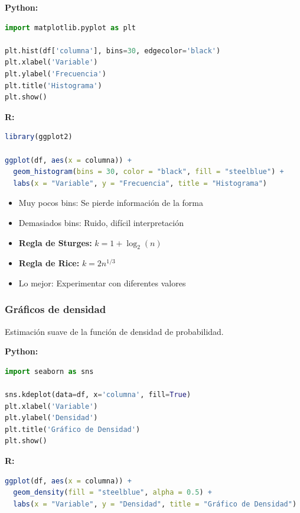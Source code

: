 \documentclass[a4paper,11pt]{article}
\begin{document}
\textbf{Python:}
\begin{lstlisting}[language=Python]
import matplotlib.pyplot as plt

plt.hist(df['columna'], bins=30, edgecolor='black')
plt.xlabel('Variable')
plt.ylabel('Frecuencia')
plt.title('Histograma')
plt.show()
\end{lstlisting}

\textbf{R:}
\begin{lstlisting}[language=R]
library(ggplot2)

ggplot(df, aes(x = columna)) +
  geom_histogram(bins = 30, color = "black", fill = "steelblue") +
  labs(x = "Variable", y = "Frecuencia", title = "Histograma")
\end{lstlisting}

\begin{tcolorbox}[colback=advertenciacolor!20, colframe=red, title=Cuidado con el número de bins]
\begin{itemize}
    \item Muy pocos bins: Se pierde información de la forma
    \item Demasiados bins: Ruido, difícil interpretación
    \item \textbf{Regla de Sturges:} $k = 1 + \log_2(n)$
    \item \textbf{Regla de Rice:} $k = 2n^{1/3}$
    \item Lo mejor: Experimentar con diferentes valores
\end{itemize}
\end{tcolorbox}

\subsubsection{Gráficos de densidad}

Estimación suave de la función de densidad de probabilidad.

\textbf{Python:}
\begin{lstlisting}[language=Python]
import seaborn as sns

sns.kdeplot(data=df, x='columna', fill=True)
plt.xlabel('Variable')
plt.ylabel('Densidad')
plt.title('Gráfico de Densidad')
plt.show()
\end{lstlisting}

\textbf{R:}
\begin{lstlisting}[language=R]
ggplot(df, aes(x = columna)) +
  geom_density(fill = "steelblue", alpha = 0.5) +
  labs(x = "Variable", y = "Densidad", title = "Gráfico de Densidad")
\end{lstlisting}
\end{document}
